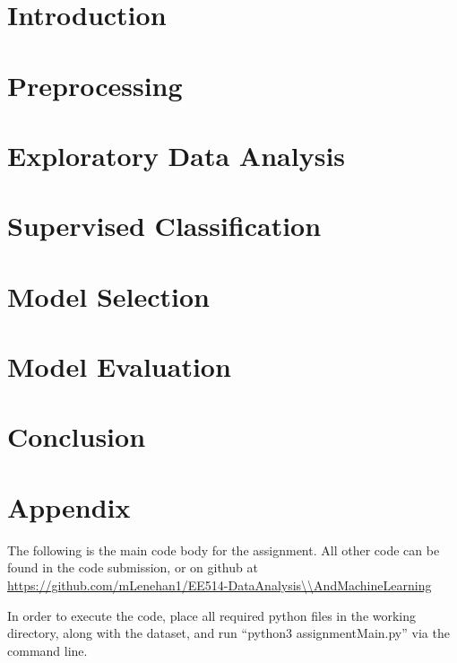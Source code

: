 \documentclass[a4paper 12pt]{article}
\begin{document}
\hypersetup{pageanchor=false}

\hypersetup{pageanchor=true}

\tableofcontents
\clearpage
\section{Introduction}

\section{Preprocessing}



\section{Exploratory Data Analysis}

\section{Supervised Classification}

\section{Model Selection}

\section{Model Evaluation}

\section{Conclusion}

\clearpage
\section{Appendix}

The following is the main code body for the assignment. All other code can be
found in the code submission, or on github at \url{https://github.com/mLenehan1/EE514-DataAnalysis\\AndMachineLearning}

\par In order to execute the code, place all required python files in the working
directory, along with the dataset, and run ``python3 assignmentMain.py'' via the command line.

\clearpage
\printbibliography
\end{document}
